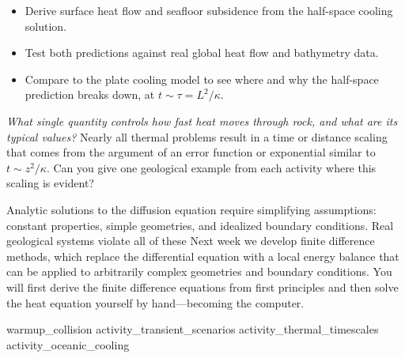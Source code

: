
\begin{itemize}
  \item Derive surface heat flow and seafloor subsidence from the half-space cooling solution.
  \item Test both predictions against real global heat flow and bathymetry data.
  \item Compare to the plate cooling model to see where and why the half-space prediction breaks down, at $t\sim\tau=L^2/\kappa$.
\end{itemize}



\emph{What single quantity controls how fast heat moves through rock, and what are its typical values?}
Nearly all thermal problems result in a time or distance scaling that comes from the argument of an error function or exponential similar to $t \sim z^2/\kappa$.  Can you give one geological example from each activity where this scaling is evident?


Analytic solutions to the diffusion equation require simplifying assumptions: constant properties, simple geometries, and idealized boundary conditions. Real geological systems violate all of these Next week we develop finite difference methods, which replace the differential equation with a local energy balance that can be applied to arbitrarily complex geometries and boundary conditions. You will first derive the finite difference equations from first principles and then solve the heat equation yourself by hand---becoming the computer.

\workshopend
\notepage
\notepage

{warmup_collision}
{activity_transient_scenarios}
{activity_thermal_timescales}
{activity_oceanic_cooling}